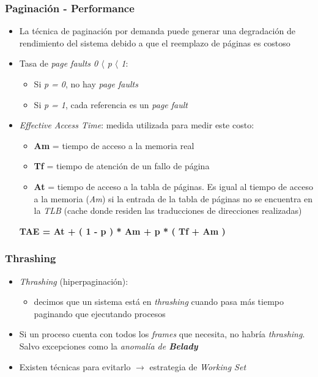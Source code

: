 \begin{frame}
  \frametitle{Paginación - \textbf{Performance}}
  \begin{itemize}
  	\item La técnica de paginación por demanda puede generar una degradación de rendimiento del sistema debido a que el reemplazo de páginas es costoso
  	\item Tasa de \emph{page faults 0 $\langle$ p $\langle$ 1}:
  	\begin{itemize}
  		\item Si \emph{p = 0}, no hay \emph{page faults}
		\item Si \emph{p = 1}, cada referencia es un \emph{page fault}
  	\end{itemize}
  	\item \emph{Effective Access Time}: medida utilizada para medir este costo:
  	\begin{itemize}
  		\item \textbf{Am} = tiempo de acceso a la memoria real
  		\item \textbf{Tf} = tiempo de atención de un fallo de página
  		\item \textbf{At} = tiempo de acceso a la tabla de páginas. Es igual al tiempo de acceso a la memoria (\emph{Am}) si la entrada de la tabla de páginas no se encuentra en la \emph{TLB} (cache donde residen las traducciones de direcciones realizadas)
  	\end{itemize}
  	\hspace{35pt} \textbf{TAE = At + ( 1 - p ) * Am + p * ( Tf + Am )}
  \end{itemize}
\end{frame}

\begin{frame}
  \frametitle{\textbf{Thrashing}}
  \begin{itemize}
  	\item \emph{Thrashing} (hiperpaginación):
  	\begin{itemize}
  		\item decimos que un sistema está en \emph{thrashing} cuando pasa más tiempo paginando que ejecutando procesos
  	\end{itemize}
  	\item Si un proceso cuenta con todos los \emph{frames} que necesita, no habría \emph{thrashing}. Salvo excepciones como la \emph{anomalía de \textbf{Belady}}
  	\item Existen técnicas para evitarlo $\rightarrow$ estrategia de \emph{Working Set}
  \end{itemize}
\end{frame}

